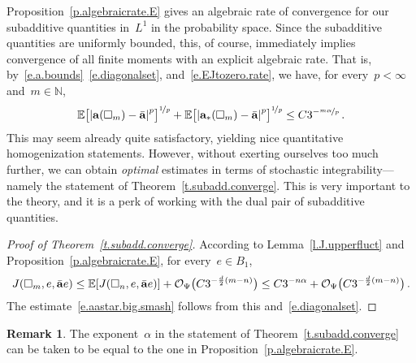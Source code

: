 \documentclass[11pt,twoside]{article} %
\let\oldsquare\square %
\renewcommand{\square}{\oldsquare}
\numberwithin{equation}{section}
\theoremstyle{definition}
\newtheorem{remark}[theorem]{Remark}
\let\originalleft\left
\let\originalright\right
\renewcommand{\left}{\mathopen{}\mathclose\bgroup\originalleft}
\renewcommand{\right}{\aftergroup\egroup\originalright}
\newcommand*{\N}{\ensuremath{\mathbb{N}}}
\renewcommand{\a}{\mathbf{a}}
\newcommand{\ahom}{\bar{\a}}
\newcommand{\cu}{\square}
\newcommand{\E}{\mathbb{E}}
\renewcommand{\O}{\mathcal{O}}
\begin{document}
Proposition~\ref{p.algebraicrate.E} gives an algebraic rate of convergence for our subadditive quantities in~$L^1$ in the probability space. Since the subadditive quantities are uniformly bounded, this, of course, immediately implies convergence of all finite moments with an explicit algebraic rate. That is, by~\eqref{e.a.bounds}~\eqref{e.diagonalset}, and~\eqref{e.EJtozero.rate}, we have, for every~$p< \infty$ and~$m\in\N$, 
\begin{align}
\label{e.giveup}
\E \bigl[ \left| \a(\cu_m) - \ahom \right|^p \bigr]^{\nicefrac1p}
+
\E \bigl[ \left| \a_*(\cu_m) - \ahom \right|^p \bigr]^{\nicefrac1p}
\leq 
C 3^{-\nicefrac{m\alpha}{p}}
\,.
\end{align}
This may seem already quite satisfactory, yielding nice quantitative homogenization statements. 
However, without exerting ourselves too much further, we can obtain \emph{optimal} estimates in terms of stochastic integrability---namely the statement of Theorem~\ref{t.subadd.converge}. This is very important to the theory, and it is a perk of working with the dual pair of subadditive quantities. 

\begin{proof}[{Proof of Theorem~\ref{t.subadd.converge}}]
\label{proof.t.subadd.converge}
According to Lemma~\ref{l.J.upperfluct} 
and Proposition~\ref{p.algebraicrate.E},
for every~$e \in B_1$,
\begin{equation*}
J(\cu_m,e,\ahom e) 
\leq 
\E \left[ J( \cu_{n},e,\ahom e) \right]
+ 
\O_\Psi\bigl( C3^{-\frac d2(m-n)} \bigr)
\leq 
C3^{-n\alpha} + 
\O_\Psi\bigl( C3^{-\frac d2(m-n)} \bigr)
\,. 
\end{equation*}
The estimate~\eqref{e.aastar.big.smash} follows from this and~\eqref{e.diagonalset}. 
\end{proof}


\begin{remark}
The exponent~$\alpha$ in the statement of Theorem~\ref{t.subadd.converge} can be taken to be equal to the one in Proposition~\ref{p.algebraicrate.E}.  
\end{remark} 
\end{document}
